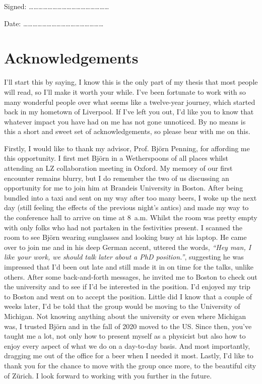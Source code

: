 \documentclass[a4paper,11pt,usegeometry]{scrreprt} %
\begin{document}
Signed:
……………………………………………
\bigskip

Date:
……………………………………………

\newpage\null\thispagestyle{empty}\newpage
\chapter*{Acknowledgements}
I'll start this by saying, I know this is the only part of my thesis that most people will read, so I'll make it worth your while. I've been fortunate to work with so many wonderful people over what seems like a twelve-year journey, which started back in my hometown of Liverpool. If I've left you out, I'd like you to know that whatever impact you have had on me has not gone unnoticed. By no means is this a short and sweet set of acknowledgements, so please bear with me on this.

Firstly, I would like to thank my advisor, Prof. Bj\"orn Penning, for affording me this opportunity. I first met Bj\"orn in a Wetherspoons of all places whilst attending an LZ collaboration meeting in Oxford. My memory of our first encounter remains blurry, but I do remember the two of us discussing an opportunity for me to join him at Brandeis University in Boston. After being bundled into a taxi and sent on my way after too many beers, I woke up the next day (still feeling the effects of the previous night's antics) and made my way to the conference hall to arrive on time at 8~a.m. Whilst the room was pretty empty with only folks who had not partaken in the festivities present. I scanned the room to see Bj\"orn wearing sunglasses and looking busy at his laptop. He came over to join me and in his deep German accent, uttered the words, \textit{``Hey man, I like your work, we should talk later about a PhD position.''}, suggesting he was impressed that I’d been out late and still made it in on time for the talks, unlike others. After some back-and-forth messages, he invited me to Boston to check out the university and to see if I'd be interested in the position. I'd enjoyed my trip to Boston and went on to accept the position. Little did I know that a couple of weeks later, I'd be told that the group would be moving to the University of Michigan. Not knowing anything about the university or even where Michigan was, I trusted Bj\"orn and in the fall of 2020 moved to the US. Since then, you've taught me a lot, not only how to present myself as a physicist but also how to enjoy every aspect of what we do on a day-to-day basis. And most importantly, dragging me out of the office for a beer when I needed it most. Lastly, I'd like to thank you for the chance to move with the group once more, to the beautiful city of Z\"urich. I look forward to working with you further in the future.
\end{document}
